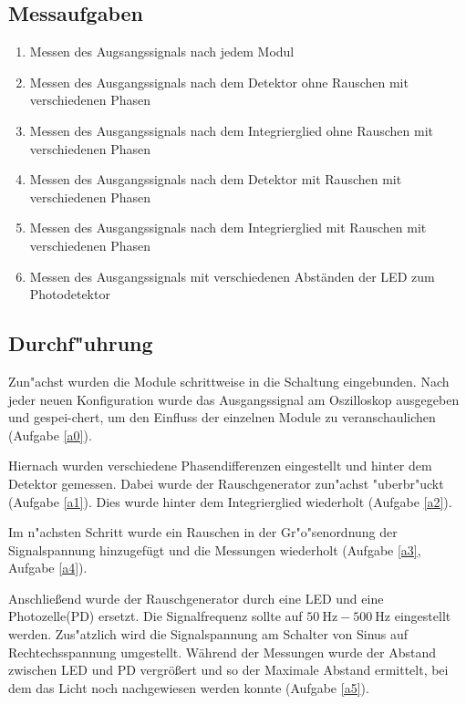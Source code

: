 \documentclass{scrartcl}
\begin{document}
		\subsection{Messaufgaben}

			\begin{enumerate}
				\item \label{a0} Messen des Augsangssignals nach jedem Modul
				\item \label{a1} Messen des Ausgangssignals nach dem Detektor ohne Rauschen mit verschiedenen Phasen
				\item \label{a2} Messen des Ausgangssignals nach dem Integrierglied ohne Rauschen mit verschiedenen Phasen
				\item \label{a3} Messen des Ausgangssignals nach dem Detektor mit Rauschen mit verschiedenen Phasen
				\item \label{a4} Messen des Ausgangssignals nach dem Integrierglied mit Rauschen mit verschiedenen Phasen
				\item \label{a5} Messen des Ausgangssignals mit verschiedenen Abständen der LED zum Photodetektor
			\end{enumerate}

		\subsection{Durchf"uhrung}

			Zun"achst wurden die Module schrittweise in die Schaltung eingebunden.
			Nach jeder neuen Konfiguration wurde das Ausgangssignal am Oszilloskop ausgegeben und gespei-chert,
			um den Einfluss der einzelnen Module zu veranschaulichen (Aufgabe \ref{a0}).

			Hiernach wurden verschiedene Phasendifferenzen eingestellt und hinter dem Detektor gemessen.
			Dabei wurde der Rauschgenerator zun"achst "uberbr"uckt (Aufgabe \ref{a1}).
			Dies wurde hinter dem Integrierglied wiederholt (Aufgabe \ref{a2}).

			Im n"achsten Schritt wurde ein Rauschen in der Gr"o"senordnung der Signalspannung hinzugefügt und die Messungen
			wiederholt (Aufgabe \ref{a3}, Aufgabe \ref{a4}).

			Anschließend wurde der Rauschgenerator durch eine LED und eine Photozelle(PD) ersetzt.
			Die Signalfrequenz sollte auf $\SI{50}{\hertz}-\SI{500}{\hertz}$ eingestellt werden.
			Zus"atzlich wird die Signalspannung am Schalter von Sinus auf Rechtechsspannung umgestellt.
			Während der Messungen wurde der Abstand zwischen LED und PD vergrößert und so der Maximale Abstand ermittelt,
			bei dem das Licht noch nachgewiesen werden konnte (Aufgabe \ref{a5}).
\end{document}
